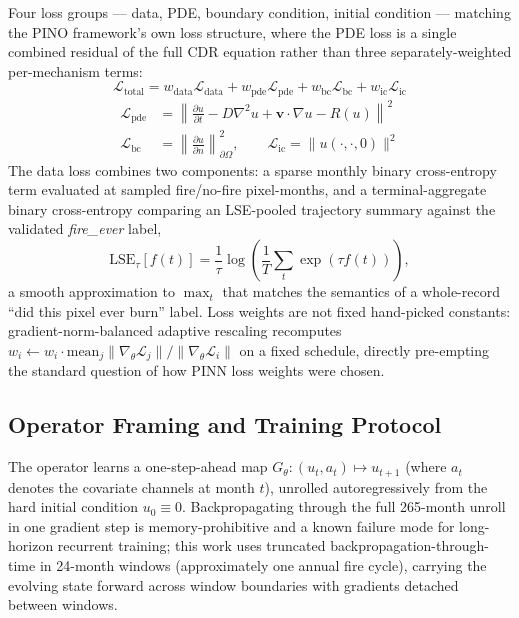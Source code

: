\documentclass[journal]{IEEEtran}
\begin{document}
Four loss groups --- data, PDE, boundary condition, initial condition --- matching the PINO framework's own loss structure, where the PDE loss is a single combined residual of the full CDR equation rather than three separately-weighted per-mechanism terms:
\begin{equation}
\mathcal{L}_{\mathrm{total}} = w_{\mathrm{data}}\mathcal{L}_{\mathrm{data}} + w_{\mathrm{pde}}\mathcal{L}_{\mathrm{pde}} + w_{\mathrm{bc}}\mathcal{L}_{\mathrm{bc}} + w_{\mathrm{ic}}\mathcal{L}_{\mathrm{ic}}
\label{eq:total_loss}
\end{equation}
\begin{align}
\mathcal{L}_{\mathrm{pde}} &= \left\| \frac{\partial u}{\partial t} - D\nabla^2 u + \mathbf{v}\cdot\nabla u - R(u) \right\|^2 \\
\mathcal{L}_{\mathrm{bc}} &= \left\| \frac{\partial u}{\partial n} \right\|^2_{\partial\Omega}, \qquad \mathcal{L}_{\mathrm{ic}} = \|u(\cdot,\cdot,0)\|^2
\end{align}
The data loss combines two components: a sparse monthly binary cross-entropy term evaluated at sampled fire/no-fire pixel-months, and a terminal-aggregate binary cross-entropy comparing an LSE-pooled trajectory summary against the validated \emph{fire\_ever} label,
\begin{equation}
\mathrm{LSE}_{\tau}[f(t)] = \frac{1}{\tau}\log\!\left(\frac{1}{T}\sum_t \exp(\tau f(t))\right),
\end{equation}
a smooth approximation to $\max_t$ that matches the semantics of a whole-record ``did this pixel ever burn'' label. Loss weights are not fixed hand-picked constants: gradient-norm-balanced adaptive rescaling \cite{wang2021gradient} recomputes $w_i \leftarrow w_i \cdot \mathrm{mean}_j\|\nabla_\theta \mathcal{L}_j\| / \|\nabla_\theta \mathcal{L}_i\|$ on a fixed schedule, directly pre-empting the standard question of how PINN loss weights were chosen.

\subsection{Operator Framing and Training Protocol}

The operator learns a one-step-ahead map $G_\theta:(u_t,a_t)\mapsto u_{t+1}$ (where $a_t$ denotes the covariate channels at month $t$), unrolled autoregressively from the hard initial condition $u_0\equiv0$. Backpropagating through the full 265-month unroll in one gradient step is memory-prohibitive and a known failure mode for long-horizon recurrent training; this work uses truncated backpropagation-through-time in 24-month windows (approximately one annual fire cycle), carrying the evolving state forward across window boundaries with gradients detached between windows.
\end{document}
